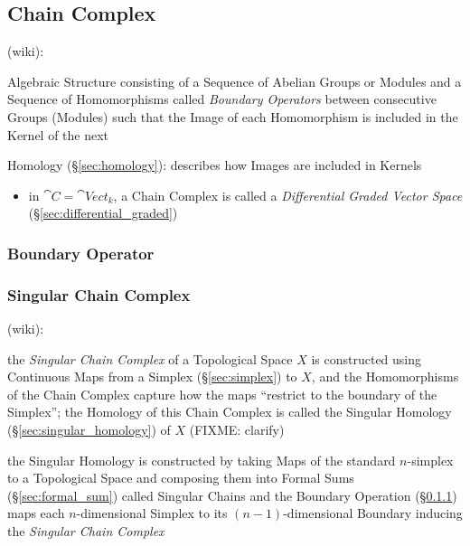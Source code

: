 \begin{itemize}
\subsection{Chain Complex}\label{sec:chain_complex}

(wiki):

Algebraic Structure consisting of a Sequence of Abelian Groups or Modules and a
Sequence of Homomorphisms called \emph{Boundary Operators} between consecutive
Groups (Modules) such that the Image of each Homomorphism is included in the
Kernel of the next

\fist Homology (\S\ref{sec:homology}): describes how Images are included in
Kernels

\begin{itemize}
  \item in $\cat{C} = \cat{Vect}_k$, a Chain Complex is called a
    \emph{Differential Graded Vector Space} (\S\ref{sec:differential_graded})
\end{itemize}



\subsubsection{Boundary Operator}\label{sec:boundary_operator}

\subsubsection{Singular Chain Complex}\label{sec:singular_chain_complex}

(wiki):

the \emph{Singular Chain Complex} of a Topological Space $X$ is constructed
using Continuous Maps from a Simplex (\S\ref{sec:simplex}) to $X$, and the
Homomorphisms of the Chain Complex capture how the maps ``restrict to the
boundary of the Simplex''; the Homology of this Chain Complex is called the
Singular Homology (\S\ref{sec:singular_homology}) of $X$ (FIXME: clarify)

the Singular Homology is constructed by taking Maps of the standard $n$-simplex
to a Topological Space and composing them into Formal
Sums (\S\ref{sec:formal_sum}) called Singular Chains and the Boundary Operation
(\S\ref{sec:boundary_operator}) maps each $n$-dimensional Simplex to its
$(n-1)$-dimensional Boundary inducing the \emph{Singular Chain Complex}




\end{itemize}
